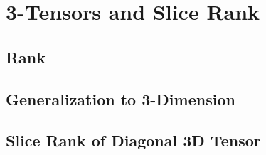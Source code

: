 \section{3-Tensors and Slice Rank}
\subsection{Rank}
\subsection{Generalization to 3-Dimension}
\subsection{Slice Rank of Diagonal 3D Tensor}